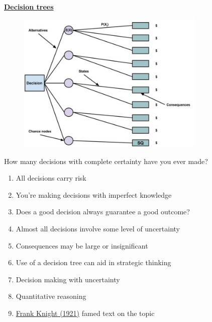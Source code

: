 \documentclass[aspectratio=1610,pdftex,dvipsnames,compress,xcolor={dvipsnames}]{beamer}
\begin{document}
\begin{frame}[plain]{}
    \centering\LARGE\textbf{\href{https://uidaho.pressbooks.pub/riskassessment/chapter/decision-trees/}{Decision trees}}
\end{frame}


\addtocounter{framenumber}{-1}
\begin{frame}{}
    \begin{figure}
        \centering
        \includegraphics[width=0.80\textwidth]{decision.tree_blank.jpg}
    \end{figure}
\end{frame}


\begin{frame}{How many decisions with complete certainty have you ever made?}
    \begin{enumerate}[series=outerlist,topsep=0pt,itemsep=11pt,leftmargin=*,label=(\arabic*)]
        \item[]All decisions carry risk
        \item[]You're making decisions with imperfect knowledge  
        \item[]Does a good decision always guarantee a good outcome?
        \item[]Almost all decisions involve some level of uncertainty  
        \item[]Consequences may be large or insignificant  
        \item[]Use of a decision tree can aid in strategic thinking
        \item[]Decision making with uncertainty  
        \item[]Quantitative reasoning
        \item[]\href{https://oll.libertyfund.org/title/knight-risk-uncertainty-and-profit}{Frank Knight (1921)} famed text on the topic
    \end{enumerate}
\end{frame}
\end{document}
